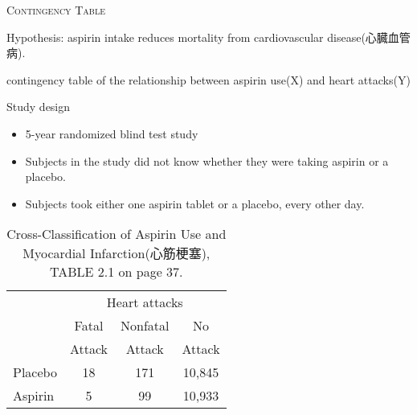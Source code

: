 \documentclass[dvipdfmx, serif,handout]{beamer}
\begin{document}
\begin{frame}{\textsc{Contingency Table}}

\bi
\item Hypothesis: aspirin intake reduces mortality from cardiovascular disease(心臓血管病). 
\item  contingency table of the relationship between aspirin use(X) and heart attacks(Y)
\item Study design
\begin{itemize}
\item 5-year randomized blind test study 
\item Subjects in the study did not know whether they were taking aspirin or a placebo. 
\item Subjects took either one aspirin tablet or a placebo, every other day.
\end{itemize}
{\scriptsize
\begin{table}
\renewcommand{\arraystretch}{1.0}
\begin{tabular}{lccc} \\ \hline
& \multicolumn{3}{c}{Heart attacks} \\ \cline{2-4}
& Fatal & Nonfatal & No \\
& Attack & Attack & Attack \\ \hline
Placebo & 18 & 171 & 10,845 \\
Aspirin & 5 & 99 & 10,933 \\ \hline
\end{tabular}
\caption{\scriptsize Cross-Classification of Aspirin Use and Myocardial Infarction(心筋梗塞), TABLE 2.1 on page 37.}
\end{table}
}
\ei

\end{frame}
\end{document}
